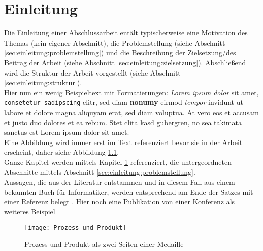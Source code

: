 %
%
%
%
\chapter{Einleitung}
\label{cha:einleitung}
Die Einleitung einer Abschlussarbeit entält typischerweise eine Motivation des Themas (kein eigener Abschnitt), die Problemstellung (siehe Abschnitt \ref{sec:einleitung:problemstellung}) und die Beschreibung der Zielsetzung/des Beitrag der Arbeit (siehe Abschnitt \ref{sec:einleitung:zielsetzung}). Abschließend wird die Struktur der Arbeit vorgestellt (siehe Abschnitt \ref{sec:einleitung:struktur}).\\ %

Hier nun ein wenig Beispieltext mit Formatierungen: \textit{Lorem ipsum dolor} sit amet, \texttt{consetetur sadipscing} elitr, sed diam \textbf{nonumy} eirmod \emph{tempor} invidunt ut labore et dolore magna aliquyam erat, sed diam voluptua. At vero eos et accusam et justo duo dolores et ea rebum. Stet clita kasd gubergren, no sea takimata sanctus est Lorem ipsum dolor sit amet. \\ %

Eine Abbildung wird immer erst im Text referenziert bevor sie in der Arbeit erscheint, daher siehe Abbildung \ref{fig:prozess-produkt}. \\ %

Ganze Kapitel werden mittels Kapitel \ref{cha:einleitung} referenziert, die untergeordneten Abschnitte mittels Abschnitt \ref{sec:einleitung:problemstellung}. \\ %

Aussagen, die aus der Literatur entstammen und in diesem Fall aus einem bekannten Buch für Informatiker, werden entsprechend am Ende der Satzes mit einer Referenz belegt \cite{Gamma95}. Hier noch eine Publikation von einer Konferenz als weiteres Beispiel \cite{Kolb14}

\begin{figure}[htp]
\begin{center}
  \texttt{[image: Prozess-und-Produkt]} %
  \caption{Prozess und Produkt als zwei Seiten einer Medaille}
  \label{fig:prozess-produkt}
\end{center}
\end{figure}

